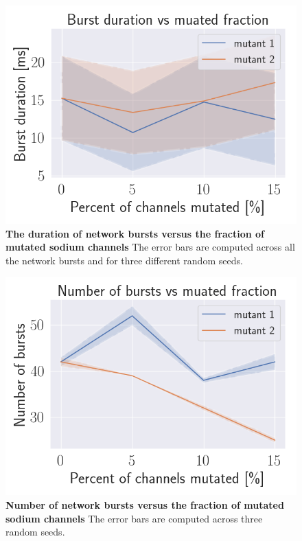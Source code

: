 \begin{figure}
    \centering
    \includegraphics[width=1\textwidth]{images/duration.png}
    \caption{\textbf{The duration of network bursts versus the fraction of mutated sodium channels}
        The error bars are computed across all the network bursts and for three different random
        seeds.}
    \label{fig:duration}
\end{figure}

\begin{figure}
    \centering
    \includegraphics[width=1\textwidth]{images/number.png}
    \caption{\textbf{Number of network bursts versus the fraction of mutated sodium channels} The
        error bars are computed across three random seeds.}
    \label{fig:number}
\end{figure}
